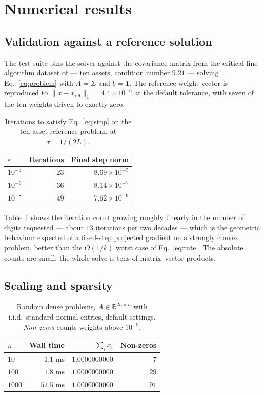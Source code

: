 \documentclass[11pt,a4paper]{article}
\newcounter{algo}
\newcommand{\R}{\mathbb{R}}
\begin{document}
\section{Numerical results}
\label{sec:results}

\subsection{Validation against a reference solution}

The test suite pins the solver against the covariance matrix from the
critical-line algorithm dataset of \citet{bailey2013} --- ten assets, condition
number $9.21$ --- solving Eq.~\eqref{eq:problem} with $A = \Sigma$ and
$b = \mathbf{1}$. The reference weight vector is reproduced to
$\|x - x_{\mathrm{ref}}\|_1 = 4.4 \times 10^{-6}$ at the default tolerance, with
seven of the ten weights driven to exactly zero.

\begin{table}[t]
\centering
\caption{Iterations to satisfy Eq.~\eqref{eq:stop} on the ten-asset reference
problem, at $\tau = 1/(2L)$.}
\label{tab:iters}
\begin{tabular}{lrr}
\toprule
$\varepsilon$ & Iterations & Final step norm \\
\midrule
$10^{-4}$ & $23$ & $8.69 \times 10^{-5}$ \\
$10^{-6}$ & $36$ & $8.14 \times 10^{-7}$ \\
$10^{-8}$ & $49$ & $7.62 \times 10^{-9}$ \\
\bottomrule
\end{tabular}
\end{table}

Table~\ref{tab:iters} shows the iteration count growing roughly linearly in the
number of digits requested --- about $13$ iterations per two decades --- which is
the geometric behaviour expected of a fixed-step projected gradient on a
strongly convex problem, better than the $O(1/k)$ worst case of
Eq.~\eqref{eq:rate}. The absolute counts are small: the whole solve is tens of
matrix--vector products.

\subsection{Scaling and sparsity}

\begin{table}[t]
\centering
\caption{Random dense problems, $A \in \R^{2n \times n}$ with i.i.d.\ standard
normal entries, default settings. \emph{Non-zeros} counts weights above
$10^{-9}$.}
\label{tab:scale}
\begin{tabular}{lrrr}
\toprule
$n$ & Wall time & $\sum_i x_i$ & Non-zeros \\
\midrule
$10$   & $1.1$ ms  & $1.0000000000$ & $7$  \\
$100$  & $1.8$ ms  & $1.0000000000$ & $29$ \\
$1000$ & $51.5$ ms & $1.0000000000$ & $91$ \\
\bottomrule
\end{tabular}
\end{table}
\end{document}
